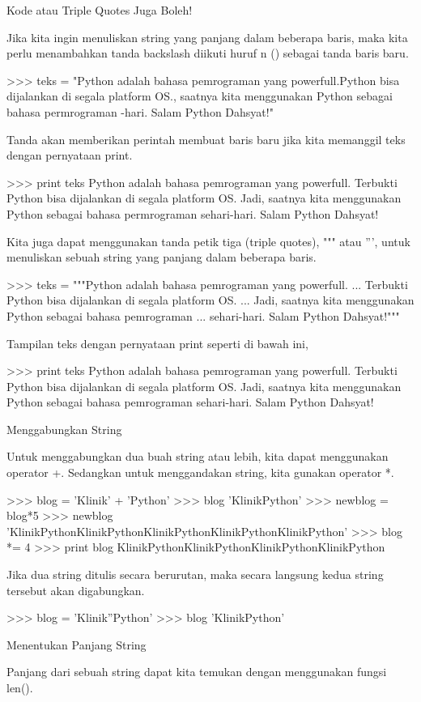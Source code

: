 Kode \n atau Triple Quotes Juga Boleh!

Jika kita ingin menuliskan string yang panjang dalam beberapa baris, maka kita perlu menambahkan tanda backslash diikuti huruf n (\n) sebagai tanda baris baru.

>>> teks = "Python adalah bahasa pemrograman yang powerfull.\nTerbukti Python bisa dijalankan di segala platform OS.\nJadi, saatnya kita menggunakan Python sebagai bahasa permrograman \nsehari-hari. Salam Python Dahsyat!"

Tanda \n akan memberikan perintah membuat baris baru jika kita memanggil teks dengan pernyataan print.

>>> print teks
Python adalah bahasa pemrograman yang powerfull.
Terbukti Python bisa dijalankan di segala platform OS.
Jadi, saatnya kita menggunakan Python sebagai bahasa permrograman
sehari-hari. Salam Python Dahsyat!

Kita juga dapat menggunakan tanda petik tiga (triple quotes), """ atau ''', untuk menuliskan sebuah string yang panjang dalam beberapa baris.

>>> teks = """Python adalah bahasa pemrograman yang powerfull.
... Terbukti Python bisa dijalankan di segala platform OS.
... Jadi, saatnya kita menggunakan Python sebagai bahasa pemrograman
... sehari-hari. Salam Python Dahsyat!"""

Tampilan teks dengan pernyataan print seperti di bawah ini,

>>> print teks
Python adalah bahasa pemrograman yang powerfull.
Terbukti Python bisa dijalankan di segala platform OS.
Jadi, saatnya kita menggunakan Python sebagai bahasa pemrograman
sehari-hari. Salam Python Dahsyat!

Menggabungkan String

Untuk menggabungkan dua buah string atau lebih, kita dapat menggunakan operator +. Sedangkan untuk menggandakan string, kita gunakan operator *.

>>> blog = 'Klinik' + 'Python'
>>> blog
'KlinikPython'
>>> newblog = blog*5
>>> newblog
'KlinikPythonKlinikPythonKlinikPythonKlinikPythonKlinikPython'
>>> blog *= 4
>>> print blog
KlinikPythonKlinikPythonKlinikPythonKlinikPython

Jika dua string ditulis secara berurutan, maka secara langsung kedua string tersebut akan digabungkan.

>>> blog = 'Klinik''Python'
>>> blog
'KlinikPython'

Menentukan Panjang String

Panjang dari sebuah string dapat kita temukan dengan menggunakan fungsi len().

